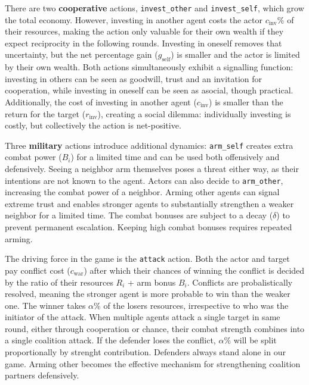 There are two \textbf{cooperative} actions, \texttt{invest\_other} and \texttt{invest\_self}, which grow the total economy. However, investing in another agent costs the actor $c_{\text{inv}}\%$ of their resources, making the action only valuable for their own wealth if they expect reciprocity in the following rounds. Investing in oneself removes that uncertainty, but the net percentage gain ($g_{\text{self}}$) is smaller and the actor is limited by their own wealth. Both actions simultaneously exhibit a signalling function: investing in others can be seen as goodwill, trust and an invitation for cooperation, while investing in oneself can be seen as asocial, though practical. Additionally, the cost of investing in another agent ($c_{\text{inv}}$) is smaller than the return for the target ($r_{\text{inv}}$), creating a social dilemma: individually investing is costly, but collectively the action is net-positive.

Three \textbf{military} actions introduce additional dynamics: \texttt{arm\_self} creates extra combat power ($B_i$) for a limited time and can be used both offensively and defensively. Seeing a neighbor arm themselves poses a threat either way, as their intentions are not known to the agent. Actors can also decide to \texttt{arm\_other}, increasing the combat power of a neighbor. Arming other agents can signal extreme trust and enables stronger agents to substantially strengthen a weaker neighbor for a limited time. The combat bonuses are subject to a decay ($\delta$) to prevent permanent escalation. Keeping high combat bonuses requires repeated arming. %

The driving force in the game is the \texttt{attack} action. Both the actor and target pay conflict cost ($c_{\text{war}}$) after which their chances of winning the conflict is decided by the ratio of their resources $R_i$ + arm bonus $B_i$. Conflicts are probalistically resolved, meaning the stronger agent is more probable to win than the weaker one. The winner takes $\alpha\%$ of the losers resources, irrespective to who was the initiator of the attack.
When multiple agents attack a single target in same round, either through cooperation or chance, their combat strength combines into a single coalition attack. If the defender loses the conflict, $\alpha\%$ will be split proportionally by strenght contribution. Defenders always stand alone in our game. Arming other becomes the effective mechanism for strengthening coalition partners defensively.

